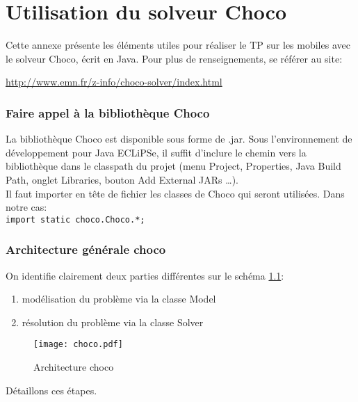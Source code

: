 \chapter{Utilisation du solveur Choco}
\label{annexe:choco}

Cette annexe présente les éléments utiles pour réaliser le TP sur les mobiles
avec le solveur Choco, écrit en Java. Pour plus de renseignements, se référer
au site:\\
\centerline{\url{http://www.emn.fr/z-info/choco-solver/index.html}}


\subsection*{Faire appel à la bibliothèque Choco}

La bibliothèque Choco est disponible sous forme de .jar. Sous l'environnement
de développement pour Java ECLiPSe, il suffit d'inclure le chemin vers la
bibliothèque dans le classpath du projet (menu Project, Properties, Java Build
Path, onglet Libraries, bouton Add External JARs \ldots).\\
Il faut importer en tête de fichier les classes de Choco qui seront utilisées.
Dans notre cas:\\
\texttt{import static choco.Choco.*;}

\subsection*{Architecture générale choco}
On identifie clairement deux parties différentes sur le schéma \ref{choco}:
\begin{enumerate}
\item modélisation du problème via la classe Model
\item résolution du problème via la classe Solver
\end{enumerate}

\begin{figure}[!ht]
\begin{center}
\texttt{[image: choco.pdf]}
\caption{Architecture choco}
\label{choco}
\end{center}
\end{figure}
Détaillons ces étapes.


